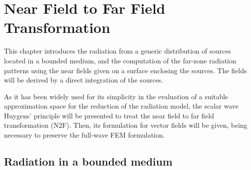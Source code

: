 \graphicspath{{img/ch1/}}
\cleardoublepage
\chapter{Near Field to Far Field Transformation} \label{chap:N2F}

\par This chapter introduces the radiation from a generic distribution of sources located in a bounded medium, and the computation of the far-zone radiation patterns using the near fields given on a surface enclosing the sources. The fields will be derived by a direct integration of the sources.
\par As it has been widely used for its simplicity in the evaluation of a suitable approximation space for the reduction of the radiation model, the scalar wave Huygens' principle will be presented to treat the near field to far field transformation (N2F). Then, its formulation for vector fields will be given, being necessary to preserve the full-wave FEM formulation.

\section{Radiation in a bounded medium}

